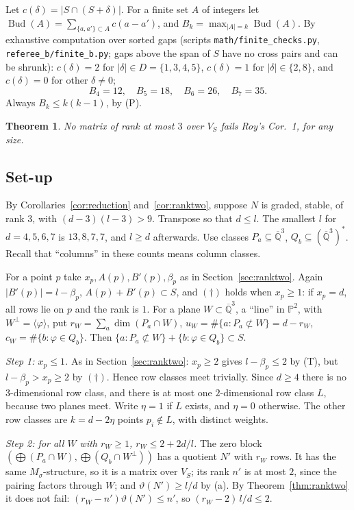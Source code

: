 \documentclass[11pt,a4paper]{article}
\theoremstyle{plain}
\newtheorem{theorem}{Theorem}
\theoremstyle{definition}
\newcommand{\Qbar}{\overline{\mathbb{Q}}}
\newcommand{\vth}{\vartheta}
\newcommand{\Bud}{\operatorname{Bud}}
\newcommand{\scr}[1]{\nolinkurl{#1}}
\begin{document}
Let $c(\delta)=|S\cap(S+\delta)|$. For a finite set $A$ of integers let $\Bud(A)=\sum_{\{a,a'\}\subset A}c(a-a')$, and $B_{k}=\max_{|A|=k}\Bud(A)$. By exhaustive computation over sorted gaps (scripts \scr{math/finite_checks.py}, \scr{referee_b/finite_b.py}; gaps above the span of $S$ have no cross pairs and can be shrunk): $c(\delta)=2$ for $|\delta|\in D=\{1,3,4,5\}$, $c(\delta)=1$ for $|\delta|\in\{2,8\}$, and $c(\delta)=0$ for other $\delta\neq0$;
\[
  B_{4}=12,\quad B_{5}=18,\quad B_{6}=26,\quad B_{7}=35.
\]
Always $B_{k}\le k(k-1)$, by (P).

\begin{theorem}\label{thm:rankthree}
No matrix of rank at most $3$ over $V_{S}$ fails Roy's Cor.~1, for any size.
\end{theorem}

\subsection{Set-up}

By Corollaries~\ref{cor:reduction} and~\ref{cor:ranktwo}, suppose $N$ is graded, stable, of rank $3$, with $(d-3)(l-3)>9$. Transpose so that $d\le l$. The smallest $l$ for $d=4,5,6,7$ is $13,8,7,7$, and $l\ge d$ afterwards. Use classes $P_{a}\subseteq\Qbar^{3}$, $Q_{b}\subseteq(\Qbar^{3})^{*}$. Recall that ``columns'' in these counts means column classes.

For a point $p$ take $x_{p},A(p),B'(p),\beta_{p}$ as in Section~\ref{sec:ranktwo}. Again $|B'(p)|=l-\beta_{p}$, $A(p)+B'(p)\subset S$, and $(\dagger)$ holds when $x_{p}\ge1$: if $x_{p}=d$, all rows lie on $p$ and the rank is $1$. For a plane $W\subset\Qbar^{3}$, a ``line'' in $\mathbb{P}^{2}$, with $W^{\perp}=\langle\varphi\rangle$, put $r_{W}=\sum_{a}\dim(P_{a}\cap W)$, $u_{W}=\#\{a:P_{a}\not\subset W\}=d-r_{W}$, $c_{W}=\#\{b:\varphi\in Q_{b}\}$. Then $\{a:P_{a}\not\subset W\}+\{b:\varphi\in Q_{b}\}\subset S$.

\emph{Step 1: $x_{p}\le1$.} As in Section~\ref{sec:ranktwo}: $x_{p}\ge2$ gives $l-\beta_{p}\le2$ by (T), but $l-\beta_{p}>x_{p}\ge2$ by $(\dagger)$. Hence row classes meet trivially. Since $d\ge4$ there is no $3$-dimensional row class, and there is at most one $2$-dimensional row class $L$, because two planes meet. Write $\eta=1$ if $L$ exists, and $\eta=0$ otherwise. The other row classes are $k=d-2\eta$ points $p_{i}\notin L$, with distinct weights.

\emph{Step 2: for all $W$ with $r_{W}\ge1$, $r_{W}\le2+2d/l$.} The zero block $(\bigoplus(P_{a}\cap W),\bigoplus(Q_{b}\cap W^{\perp}))$ has a quotient $N'$ with $r_{W}$ rows. It has the same $M_{\sigma}$-structure, so it is a matrix over $V_{S}$; its rank $n'$ is at most $2$, since the pairing factors through $W$; and $\vth(N')\ge l/d$ by (a). By Theorem~\ref{thm:ranktwo} it does not fail: $(r_{W}-n')\vth(N')\le n'$, so $(r_{W}-2)\,l/d\le2$.
\end{document}
